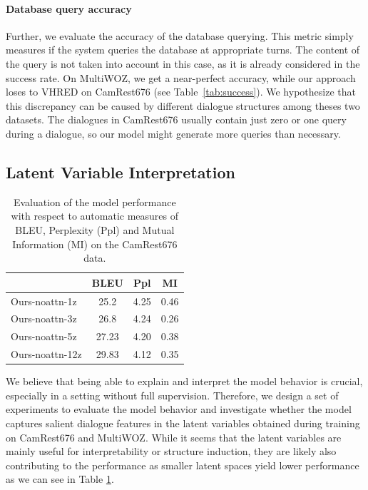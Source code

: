 \paragraph{Database query accuracy}
Further, we evaluate the accuracy of the database querying.
This metric simply measures if the system queries the database at appropriate turns.
The content of the query is not taken into account in this case, as it is already considered in the success rate. On MultiWOZ, we get a near-perfect accuracy, while our approach loses to VHRED on CamRest676 (see Table~\ref{tab:success}).
We hypothesize that this discrepancy can be caused by different dialogue structures among theses two datasets. The dialogues in CamRest676 usually contain just zero or one query during a dialogue, so our model might generate more queries than necessary.

\subsection{Latent Variable Interpretation}
\label{sec:latents}
\begin{table}[h]
    \centering\small
    \begin{tabular}{l|ccc}
      \toprule
      & BLEU & Ppl & MI  \\
    \midrule
    Ours-noattn-1z  & 25.2 & 4.25 & 0.46  \\
    Ours-noattn-3z  & 26.8 & 4.24 & 0.26  \\
    Ours-noattn-5z  & 27.23 & 4.20 & 0.38  \\
    Ours-noattn-12z  & 29.83 & 4.12 & 0.35  \\    

    \bottomrule
  \end{tabular}
  \caption{Evaluation of the model performance with respect to automatic measures of BLEU, Perplexity (Ppl) and Mutual Information (MI) on the CamRest676 data.}
  \label{05:z_counts}
\end{table}
We believe that being able to explain and interpret the model behavior is crucial, especially in a setting without full supervision.
Therefore, we design a set of experiments to evaluate the model behavior and investigate whether the model captures salient dialogue features in the latent variables obtained during training on CamRest676 and MultiWOZ.
While it seems that the latent variables are mainly useful for interpretability or structure induction, they are likely also contributing to the performance as smaller latent spaces yield lower performance as we can see in Table \ref{05:z_counts}.

